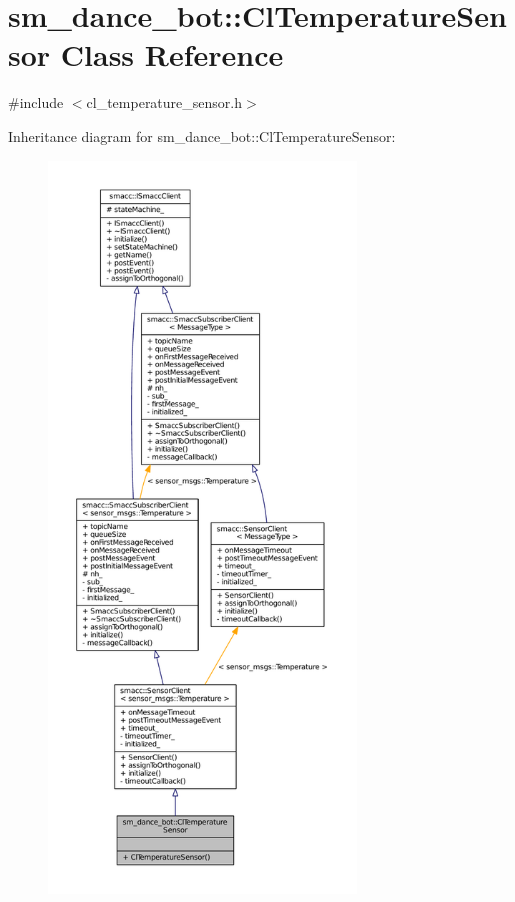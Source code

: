 \hypertarget{classsm__dance__bot_1_1ClTemperatureSensor}{}\section{sm\+\_\+dance\+\_\+bot\+:\+:Cl\+Temperature\+Sensor Class Reference}
\label{classsm__dance__bot_1_1ClTemperatureSensor}


{\ttfamily \#include $<$cl\+\_\+temperature\+\_\+sensor.\+h$>$}



Inheritance diagram for sm\+\_\+dance\+\_\+bot\+:\+:Cl\+Temperature\+Sensor\+:
\nopagebreak
\begin{figure}[H]
\begin{center}
\leavevmode
\includegraphics[height=550pt]{classsm__dance__bot_1_1ClTemperatureSensor__inherit__graph}
\end{center}
\end{figure}


